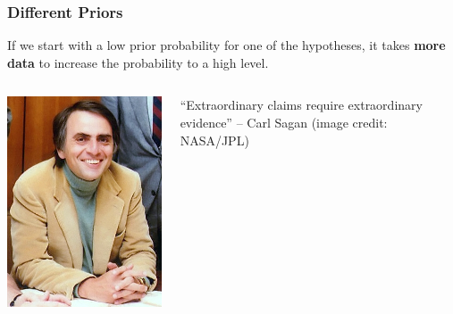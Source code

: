 \documentclass{beamer}
\begin{document}
\begin{frame}
\frametitle{Different Priors}
If we start with a low prior probability for one of the hypotheses, it takes
{\bf more data} to increase the probability to a high level.



    \begin{columns} %
        \hspace{2em}
        \includegraphics[width=0.6\linewidth]{images/sagan.jpg}

        ``Extraordinary claims require extraordinary evidence'' --
        Carl Sagan (image credit: NASA/JPL)
     \end{columns}


\end{frame}
\end{document}
